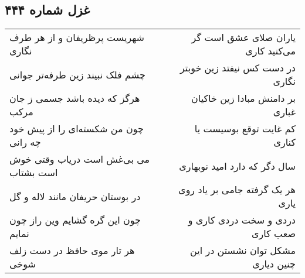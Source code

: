\begin{center}
\section*{غزل شماره ۴۴۴}
\label{sec:sh444}
\begin{longtable}{l p{0.5cm} r}
شهریست پرظریفان و از هر طرف نگاری
&&
یاران صلای عشق است گر می‌کنید کاری
\\
چشم فلک نبیند زین طرفه‌تر جوانی
&&
در دست کس نیفتد زین خوبتر نگاری
\\
هرگز که دیده باشد جسمی ز جان مرکب
&&
بر دامنش مبادا زین خاکیان غباری
\\
چون من شکسته‌ای را از پیش خود چه رانی
&&
کم غایت توقع بوسیست یا کناری
\\
می بی‌غش است دریاب وقتی خوش است بشتاب
&&
سال دگر که دارد امید نوبهاری
\\
در بوستان حریفان مانند لاله و گل
&&
هر یک گرفته جامی بر یاد روی یاری
\\
چون این گره گشایم وین راز چون نمایم
&&
دردی و سخت دردی کاری و صعب کاری
\\
هر تار موی حافظ در دست زلف شوخی
&&
مشکل توان نشستن در این چنین دیاری
\\
\end{longtable}
\end{center}

